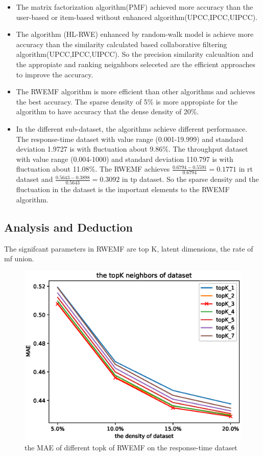 \documentclass[conference]{IEEEtran}
\begin{document}
\begin{itemize}
\item The matrix factorization algorithm(PMF) achieved more accuracy than the user-based or item-based without enhanced algorithm(UPCC,IPCC,UIPCC). 
\item The algorithm (HL-RWE) enhanced by random-walk model is achieve more accuracy than the similarity calculated based collaborative filtering algorithm(UPCC,IPCC,UIPCC). So the precision similarity calcualtion and the appropiate and ranking neignhbors seleceted are the efficient approaches to improve the accuracy.
\item The RWEMF algorithm is more efficient than other algorithms and achieves the best accuracy. The sparse density of 5\% is more appropiate for the algorithm to have accuracy that the dense density of 20\%.
\item In the different sub-dataset, the algorithms achieve different performance. The response-time dataset with value range (0.001-19.999) and standard deviation 1.9727 is with fluctuation about 9.86\%. The throughput dataset with value range (0.004-1000) and standard deviation 110.797 is with fluctuation about 11.08\%. The RWEMF achieves $\frac{0.6794-0.5591}{0.6794}=0.1771$ in rt dataset and $\frac{0.5643-0.3898}{0.5643}=0.3092$ in tp dataset. So the sparse density and the fluctuation in the dataset is the important elements to the RWEMF algorithm.
\end{itemize}

\subsection{Analysis and Deduction}
\par The signifcant parameters in RWEMF are top K, latent dimensions, the rate of mf union. 

\begin{figure}[H]  
\centering  
\includegraphics[width=0.45\paperwidth]{topk_rt.eps}  
\caption{the MAE of different topk of RWEMF on the response-time dataset }  
\label{fig_rt}  
\end{figure} 
\end{document}
